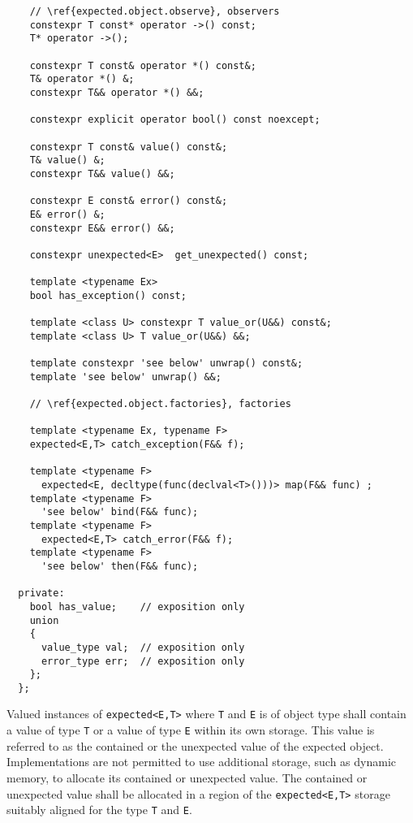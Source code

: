 \documentclass[a4paper,10pt]{article}
\newcommand{\cpp}[1]{\lstinline{#1}}
\begin{document}
\begin{lstlisting}
    // \ref{expected.object.observe}, observers
    constexpr T const* operator ->() const;
    T* operator ->();
    
    constexpr T const& operator *() const&;
    T& operator *() &;
    constexpr T&& operator *() &&;
    
    constexpr explicit operator bool() const noexcept;
    
    constexpr T const& value() const&;
    T& value() &;
    constexpr T&& value() &&;
    
    constexpr E const& error() const&;
    E& error() &;
    constexpr E&& error() &&;
    
    constexpr unexpected<E>  get_unexpected() const;
    
    template <typename Ex>
    bool has_exception() const;
      
    template <class U> constexpr T value_or(U&&) const&;
    template <class U> T value_or(U&&) &&;
    
    template constexpr 'see below' unwrap() const&;
    template 'see below' unwrap() &&;

    // \ref{expected.object.factories}, factories

    template <typename Ex, typename F>
    expected<E,T> catch_exception(F&& f);

    template <typename F>
      expected<E, decltype(func(declval<T>()))> map(F&& func) ;
    template <typename F>
      'see below' bind(F&& func);
    template <typename F>
      expected<E,T> catch_error(F&& f);
    template <typename F>
      'see below' then(F&& func);
  
  private:
    bool has_value;    // exposition only
    union
    {
      value_type val;  // exposition only
      error_type err;  // exposition only
    };
  };

\end{lstlisting}


Valued instances of \cpp{expected<E,T>} where \cpp{T} and \cpp{E} is of object type shall contain a value of type \cpp{T} or a value of type \cpp{E} within its own storage. This value is referred to as the contained or the unexpected value of the expected object. Implementations are not permitted to use additional storage, such as dynamic memory, to allocate its contained or unexpected value. The contained or unexpected value shall be allocated in a region of the \cpp{expected<E,T>} storage suitably aligned for the type \cpp{T} and \cpp{E}.
\newline
\end{document}
